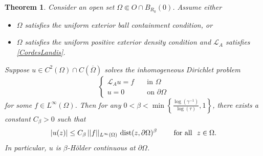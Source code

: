 \documentclass[12pt]{amsart}
\newtheorem{Theorem}{Theorem}[section]
\newcommand{\Lop}{\mathcal{L}}
\def \L {\mathcal{L}}
\def \O {\Omega}
\begin{document}
\begin{Theorem}\label{thm:bdy-Holder}
Consider an open set $\O\Subset O\cap B_{R_0}(0)$. Assume either
\begin{itemize}
\item[(uH1)] $\O$ satisfies the uniform exterior ball containment condition, or
\item[(uH2)] $\O$ satisfies the uniform positive exterior density condition and $\Lop_A$ satisfies \eqref{CordesLandis}.
\end{itemize} 
Suppose $u\in C^2(\O)\cap C(\overline{\O})$ solves the inhomogeneous Dirichlet problem
$$
\begin{cases}
\L_A u = f & \quad \text{in } \O \\
u = 0 & \quad \text{on } \partial\O
\end{cases}
$$
for some $f \in L^{\infty}(\O)$. Then for any $0<\beta<\min\left\{\frac{\log(\gamma^{-1})}{\log(\tau)},1\right\}$, there exists a constant $C_\beta > 0$ such that
\begin{equation}\label{bdryHolderestimate}
|u(z)| \leq C_\beta\, ||f||_{L^{\infty}(\O)} \ {\rm{dist}}(z, \partial\O)^{\beta} \qquad \text{ for all } \ z \in \O.
\end{equation}
In particular, $u$ is $\beta$-H\"older continuous at $\partial \O$.
\end{Theorem}
\end{document}
